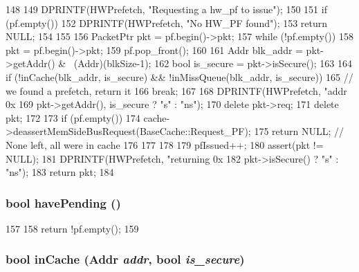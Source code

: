 \begin{DoxyCode}
148 {
149     DPRINTF(HWPrefetch, "Requesting a hw_pf to issue\n");
150 
151     if (pf.empty()) {
152         DPRINTF(HWPrefetch, "No HW_PF found\n");
153         return NULL;
154     }
155 
156     PacketPtr pkt = pf.begin()->pkt;
157     while (!pf.empty()) {
158         pkt = pf.begin()->pkt;
159         pf.pop_front();
160 
161         Addr blk_addr = pkt->getAddr() & ~(Addr)(blkSize-1);
162         bool is_secure = pkt->isSecure();
163 
164         if (!inCache(blk_addr, is_secure) && !inMissQueue(blk_addr, is_secure))
165             // we found a prefetch, return it
166             break;
167 
168         DPRINTF(HWPrefetch, "addr 0x%
169                 pkt->getAddr(), is_secure ? "s" : "ns");
170         delete pkt->req;
171         delete pkt;
172 
173         if (pf.empty()) {
174             cache->deassertMemSideBusRequest(BaseCache::Request_PF);
175             return NULL; // None left, all were in cache
176         }
177     }
178 
179     pfIssued++;
180     assert(pkt != NULL);
181     DPRINTF(HWPrefetch, "returning 0x%
182             pkt->isSecure() ? "s" : "ns");
183     return pkt;
184 }
\end{DoxyCode}
\hypertarget{classBasePrefetcher_a1ea6e3ce1b4860ce7b2da36b169e6ff5}{
\subsubsection[{havePending}]{\setlength{\rightskip}{0pt plus 5cm}bool havePending ()}}
\label{classBasePrefetcher_a1ea6e3ce1b4860ce7b2da36b169e6ff5}



\begin{DoxyCode}
157     {
158         return !pf.empty();
159     }
\end{DoxyCode}
\hypertarget{classBasePrefetcher_a1c1743bff8e77d48e43b38e1b8bcb7e6}{
\subsubsection[{inCache}]{\setlength{\rightskip}{0pt plus 5cm}bool inCache ({\bf Addr} {\em addr}, \/  bool {\em is\_\-secure})}}
\label{classBasePrefetcher_a1c1743bff8e77d48e43b38e1b8bcb7e6}



